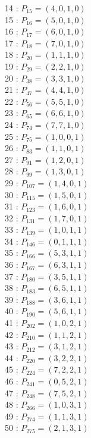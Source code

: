 \documentclass{article}
\begin{document}
{\begin{multicols}{3}
14 : $P_{15}=( 4, 0, 1, 0 )$\\
15 : $P_{16}=( 5, 0, 1, 0 )$\\
16 : $P_{17}=( 6, 0, 1, 0 )$\\
17 : $P_{18}=( 7, 0, 1, 0 )$\\
18 : $P_{20}=( 1, 1, 1, 0 )$\\
19 : $P_{29}=( 2, 2, 1, 0 )$\\
20 : $P_{38}=( 3, 3, 1, 0 )$\\
21 : $P_{47}=( 4, 4, 1, 0 )$\\
22 : $P_{56}=( 5, 5, 1, 0 )$\\
23 : $P_{65}=( 6, 6, 1, 0 )$\\
24 : $P_{74}=( 7, 7, 1, 0 )$\\
25 : $P_{75}=( 1, 0, 0, 1 )$\\
26 : $P_{83}=( 1, 1, 0, 1 )$\\
27 : $P_{91}=( 1, 2, 0, 1 )$\\
28 : $P_{99}=( 1, 3, 0, 1 )$\\
29 : $P_{107}=( 1, 4, 0, 1 )$\\
30 : $P_{115}=( 1, 5, 0, 1 )$\\
31 : $P_{123}=( 1, 6, 0, 1 )$\\
32 : $P_{131}=( 1, 7, 0, 1 )$\\
33 : $P_{139}=( 1, 0, 1, 1 )$\\
34 : $P_{146}=( 0, 1, 1, 1 )$\\
35 : $P_{166}=( 5, 3, 1, 1 )$\\
36 : $P_{167}=( 6, 3, 1, 1 )$\\
37 : $P_{180}=( 3, 5, 1, 1 )$\\
38 : $P_{183}=( 6, 5, 1, 1 )$\\
39 : $P_{188}=( 3, 6, 1, 1 )$\\
40 : $P_{190}=( 5, 6, 1, 1 )$\\
41 : $P_{202}=( 1, 0, 2, 1 )$\\
42 : $P_{210}=( 1, 1, 2, 1 )$\\
43 : $P_{212}=( 3, 1, 2, 1 )$\\
44 : $P_{220}=( 3, 2, 2, 1 )$\\
45 : $P_{224}=( 7, 2, 2, 1 )$\\
46 : $P_{241}=( 0, 5, 2, 1 )$\\
47 : $P_{248}=( 7, 5, 2, 1 )$\\
48 : $P_{266}=( 1, 0, 3, 1 )$\\
49 : $P_{274}=( 1, 1, 3, 1 )$\\
50 : $P_{275}=( 2, 1, 3, 1 )$\\

\end{multicols}}
\end{document}
